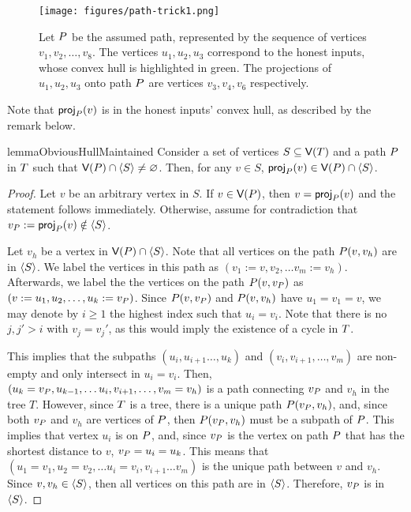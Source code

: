 \begin{figure}[h]
\centering
\texttt{[image: figures/path-trick1.png]}
\caption{Let $P$ be the assumed path, represented by the sequence of vertices $v_1, v_2, \dots, v_8$. The vertices $u_1, u_2, u_3$ correspond to the honest inputs, whose convex hull is highlighted in green. The projections of $u_1, u_2, u_3$ onto path $P$ are vertices $v_3, v_4, v_6$ respectively. 
}\label{figure:path-trick}
\end{figure}

Note that $\textsf{proj}_{P}(v)$ is in the honest inputs' convex hull, as described by the remark below.
\begin{restatable}{lemma}{ObviousHullMaintained}\label{remark:convex-hull-maintained}
    Consider a set of vertices $S \subseteq \textsf{V}(T)$ and a path $P$ in $T$ such that $\textsf{V}(P) \cap \langle{S}\rangle \neq \varnothing$. Then, for any $v \in S$, $\textsf{proj}_{P}(v) \in \textsf{V}(P) \cap \langle{S}\rangle$.
\end{restatable}
\begin{proof}
    Let $v$ be an arbitrary vertex in $S$. If $v \in \textsf{V}(P)$, then $v = \textsf{proj}_{P}(v)$ and the statement follows immediately.
    Otherwise, assume for contradiction that $v_{P} := \textsf{proj}_{P}(v) \notin \langle{S}\rangle$.
    
    Let $v_h$ be a vertex in $\textsf{V}(P) \cap \langle{S}\rangle$.  Note that all vertices on the path $P(v, v_h)$ are in $\langle{S}\rangle$. We label the vertices in this path as  $(v_1 := v, v_2, \ldots v_m := v_h)$.
    Afterwards, we label the the vertices on the path $P(v, v_{P})$ as $(v := u_1, u_2, \ldots, u_k := v_{P})$. Since $P(v, v_{P})$ and $P(v, v_h)$ have $u_1 = v_1 = v$, we may denote by $i \geq 1$ the highest index such that $u_i = v_i$.  Note that there is no $j, j' > i$ with $v_j = v_j'$, as this would imply the existence of a cycle in $T$. 

    
     This implies that the subpaths $(u_i, u_{i + 1} \ldots, u_k)$ and $(v_i, v_{i + 1}, \ldots, v_m)$ are non-empty and only intersect in $u_i = v_i$. Then, $(u_k = v_{P}, u_{k - 1}, \ldots u_i, v_{i + 1}, \ldots, v_m = v_h)$ is a path connecting $v_{P}$ and $v_h$ in the tree $T$.
    However, since $T$ is a tree, there is a unique path $P(v_{P}, v_h)$, and, since both $v_{P}$ and $v_h$ are vertices of $P$, then $P(v_{P}, v_h)$ must be a subpath of $P$.
    This implies that vertex $u_i$ is on $P$, and, since $v_{P}$ is the vertex on path $P$ that has the shortest distance to $v$, $v_{P} = u_i = u_k$. This means that $(u_1 = v_1, u_2 = v_2, \ldots u_i = v_i, v_{i + 1} \dots v_m)$ is the unique path between $v$ and $v_h$. Since $v, v_h \in \langle{S}\rangle$, then all vertices on this path are in $\langle{S}\rangle$. Therefore,  $v_{P}$ is in $\langle{S}\rangle$.
\end{proof}

